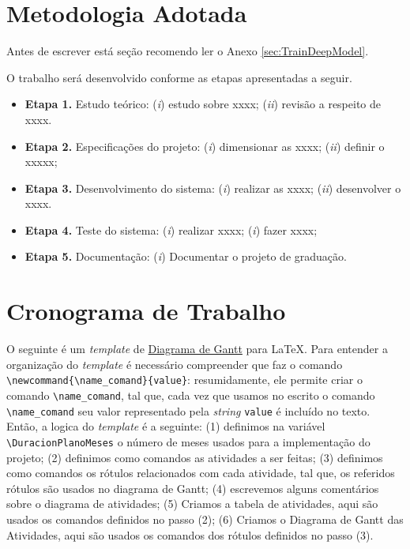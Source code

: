 \section{Metodologia Adotada}


 Antes de escrever está seção recomendo ler o Anexo \ref{sec:TrainDeepModel}.


O trabalho será desenvolvido conforme as etapas apresentadas a seguir.

\begin{itemize}
\item 
\textbf{Etapa 1.} Estudo teórico:
(\textit{i}) estudo sobre xxxx;
(\textit{ii}) revisão a respeito de xxxx.
\item 
\textbf{Etapa 2.} Especificações do projeto:
(\textit{i}) dimensionar as xxxx;
(\textit{ii}) definir o xxxxx;
\item 
\textbf{Etapa 3.} Desenvolvimento do sistema:
(\textit{i}) realizar as xxxx;
(\textit{ii}) desenvolver o xxxx.
\item 
\textbf{Etapa 4.} Teste do sistema:
(\textit{i}) realizar xxxx;
(\textit{i}) fazer xxxx;
\item 
\textbf{Etapa 5.} Documentação:
(\textit{i}) Documentar o projeto de graduação.
\end{itemize}

\section{Cronograma de Trabalho}

 O seguinte é um \textit{template} de \href{https://pt.wikipedia.org/wiki/Diagrama_de_Gantt}{Diagrama de Gantt} para \LaTeX. Para entender a organização do \textit{template} é necessário compreender que faz o comando \verb|\newcommand{\name_comand}{value}|: resumidamente, ele permite criar o comando  \verb|\name_comand|, tal que, cada vez que usamos no escrito o comando \verb|\name_comand| seu valor representado pela \textit{string} \verb|value| é incluído no texto. Então, a logica do \textit{template} é a seguinte: 
(1) definimos na variável \verb|\DuracionPlanoMeses| o número de meses usados para a implementação do projeto; 
(2) definimos como comandos as atividades a ser feitas; 
(3) definimos como comandos os rótulos relacionados com cada atividade, tal que, os referidos rótulos são usados no diagrama de Gantt; 
(4) escrevemos alguns comentários sobre o diagrama de atividades;
(5) Criamos a tabela de atividades, aqui são usados os comandos definidos no passo (2);
(6) Criamos o Diagrama de Gantt das Atividades, aqui são usados os comandos dos rótulos definidos no passo (3). 

